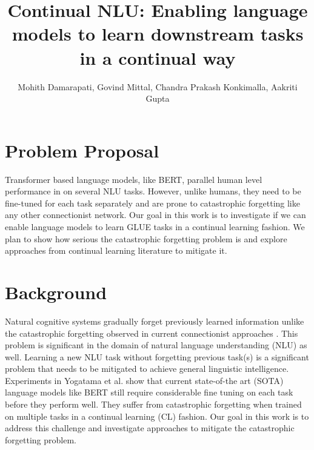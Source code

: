 \documentclass[11pt,a4paper]{article}
\title{Continual NLU: Enabling language models to learn downstream tasks in a continual way}
\author{Mohith Damarapati, Govind Mittal, Chandra Prakash Konkimalla, Aakriti Gupta}
\date{}
\begin{document}
\maketitle

\vspace{-2cm}

\section{Problem Proposal}

Transformer based language models, like BERT, parallel human level performance in on several NLU tasks.  However, unlike humans, they need to be fine-tuned for each task separately and are prone to catastrophic forgetting like any other connectionist network. Our goal in this work is to investigate if we can enable language models to learn GLUE tasks in a continual learning fashion. We plan to show how serious the catastrophic forgetting problem is and explore approaches from continual learning literature to mitigate it.  


\section{Background}

Natural cognitive systems gradually forget previously learned information unlike the catastrophic forgetting observed in current connectionist approaches \cite{french1999catastrophic}. This problem is significant in the domain of natural language understanding (NLU) as well.  Learning a new NLU task without forgetting previous task(s) is a significant problem that needs to be mitigated to achieve general linguistic intelligence. Experiments in Yogatama et al. \cite{DBLP:journals/corr/abs-1901-11373} show that current state-of-the art (SOTA) language models like BERT \cite{DBLP:journals/corr/abs-1810-04805} still require considerable fine tuning on each task before they perform well. They suffer from catastrophic forgetting when trained on multiple tasks in a continual learning (CL) fashion.   Our goal in this work is to address this challenge and investigate approaches to mitigate the catastrophic forgetting problem. 
\end{document}
